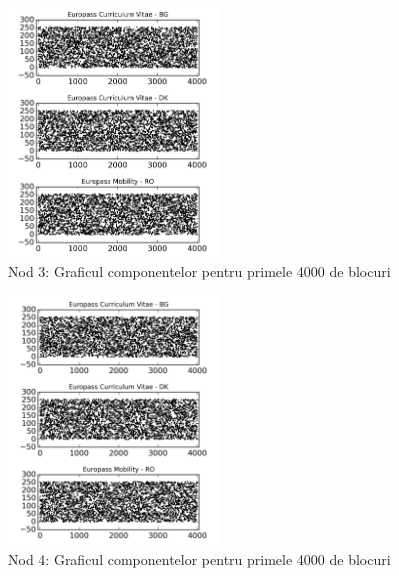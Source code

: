 \documentclass[oneside, 12pt]{book}
\begin{document}
\begin{figure}[t!]
\begin{center}
\includegraphics[width=0.5\textwidth]{img/db3_c.png}    %
\caption{Nod 3: Graficul componentelor pentru primele 4000 de blocuri} 
\label{fig:db3_c}
\end{center}
\end{figure}

\begin{figure}[t!]
\begin{center}
\includegraphics[width=0.5\textwidth]{img/db4_c.png}    %
\caption{Nod 4: Graficul componentelor pentru primele 4000 de blocuri} 
\label{fig:db4_c}
\end{center}
\end{figure}
\end{document}
